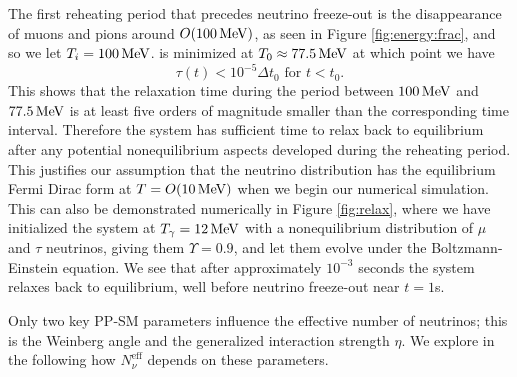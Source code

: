  The first reheating period that precedes neutrino freeze-out is the disappearance of muons and pions around $O(100\text{\,MeV})$, as seen in Figure \ref{fig:energy:frac}, and so we let $T_i=100\text{\,MeV}$.  is minimized at $T_0\approx 77.5\text{\,MeV}$ at which point we have 
\begin{equation}
\tau(t)<10^{-5} \Delta t_0 \text{ for } t<t_0.
\end{equation}
This shows that the relaxation time during the period between $100\text{\,MeV}$ and $77.5\text{\,MeV}$ is at least five orders of magnitude smaller than the corresponding time interval. Therefore the system has sufficient time to relax back to equilibrium after any potential nonequilibrium aspects developed during the reheating period. This justifies our assumption that the neutrino distribution has the equilibrium Fermi Dirac form at $T=O(10 \text{\,MeV})$ when we begin our numerical simulation. This can also be demonstrated numerically in Figure \ref{fig:relax}, where we have initialized the system at $T_\gamma=12\text{\,MeV}$ with a nonequilibrium distribution of $\mu$ and $\tau$ neutrinos, giving them $\Upsilon=0.9$, and let them evolve under the Boltzmann-Einstein equation. We see that after approximately $10^{-3}$ seconds the system relaxes back to equilibrium, well before neutrino freeze-out near $t=1$s.

Only two key PP-SM parameters influence the effective number of neutrinos; this is the Weinberg angle and the generalized interaction strength $\eta$. We explore in the following how $N_\nu^{\mathrm{eff}}$ depends on these parameters.


